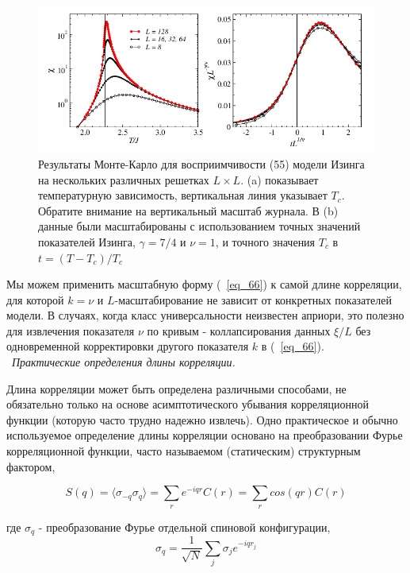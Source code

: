 \documentclass[11pt]{article}
\begin{document}
\begin{figure}[htp]
\centering
\includegraphics[scale=0.5]{fig14}
\caption{Результаты Монте-Карло для восприимчивости (55) модели Изинга на нескольких различных решетках $L × L$. (a) показывает температурную зависимость, вертикальная линия указывает $T_c$. Обратите внимание на вертикальный масштаб журнала. В (b) данные были масштабированы с использованием точных значений показателей Изинга, $\gamma = 7/4$ и $\nu = 1$, и точного значения $T_c$ в $t = (T - T_c) / T_c$}
\label{}
\end{figure}

Мы можем применить масштабную форму (~\ref{eq_66}) к самой длине корреляции, для которой $k = \nu $ и $L$-масштабирование не зависит от конкретных показателей модели. В случаях, когда класс универсальности неизвестен априори, это полезно для извлечения показателя $\nu$ по кривым - коллапсирования данных $\xi/L$ без одновременной корректировки другого показателя $k$ в (~\ref{eq_66}).\\

~\emph{Практические определения длины корреляции.}

Длина корреляции может быть определена различными способами, не обязательно только на основе асимптотического убывания корреляционной функции (которую часто трудно надежно извлечь). Одно практическое и обычно используемое определение длины корреляции основано на преобразовании Фурье корреляционной функции, часто называемом (статическим) структурным фактором,

\begin{equation}
S(q) = \langle \sigma_{-q}\sigma_q\rangle = \sum\limits_{r}e^{-iqr}C(r)=\sum\limits_{r}cos(qr)C(r)
\label{eq_68}
\end{equation}

где $\sigma_q$ - преобразование Фурье отдельной спиновой конфигурации,
\begin{equation}
\sigma_q = \frac{1}{\sqrt{N}}\sum\limits_{j} \sigma_j e^{-iqr_j}
\label{eq_69}
\end{equation}
\end{document}
